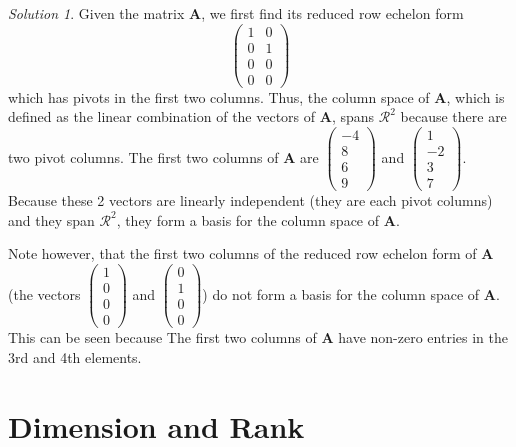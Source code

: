 \documentclass[
]{book}
\theoremstyle{definition}
\theoremstyle{definition}
\theoremstyle{definition}
\theoremstyle{remark}
\newtheorem*{solution}{Solution}
\begin{document}
\begin{solution}

Given the matrix \(\mathbf{A}\), we first find its reduced row echelon form
\[
\begin{pmatrix} 1 & 0 \\ 0 & 1 \\ 0 & 0 \\ 0 & 0 \end{pmatrix}
\]
which has pivots in the first two columns. Thus, the column space of \(\mathbf{A}\), which is defined as the linear combination of the vectors of \(\mathbf{A}\), spans \(\mathcal{R}^2\) because there are two pivot columns. The first two columns of \(\mathbf{A}\) are \(\begin{pmatrix} -4 \\ 8 \\ 6 \\ 9 \end{pmatrix}\) and \(\begin{pmatrix} 1 \\ -2 \\ 3 \\ 7 \end{pmatrix}\). Because these 2 vectors are linearly independent (they are each pivot columns) and they span \(\mathcal{R}^2\), they form a basis for the column space of \(\mathbf{A}\).

Note however, that the first two columns of the reduced row echelon form of \(\mathbf{A}\) (the vectors \(\begin{pmatrix} 1 \\ 0 \\ 0 \\ 0 \end{pmatrix}\) and \(\begin{pmatrix} 0 \\ 1 \\ 0 \\ 0 \end{pmatrix}\)) do not form a basis for the column space of \(\mathbf{A}\). This can be seen because The first two columns of \(\mathbf{A}\) have non-zero entries in the 3rd and 4th elements.

\end{solution}

\hypertarget{dimension-and-rank}{%
\chapter{Dimension and Rank}\label{dimension-and-rank}}
\end{document}
